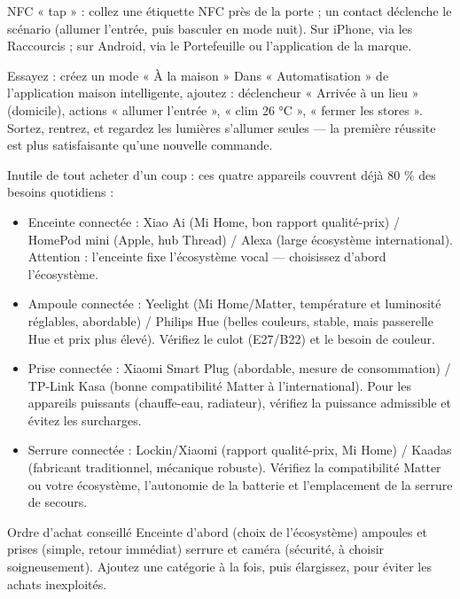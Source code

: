 NFC « tap » : collez une étiquette NFC près de la porte ; un contact déclenche le scénario (allumer l'entrée, puis basculer en mode nuit). Sur iPhone, via les Raccourcis ; sur Android, via le Portefeuille ou l'application de la marque.

\begin{tcbpractice}{Essayez : créez un mode « À la maison »}
Dans « Automatisation » de l'application maison intelligente, ajoutez : déclencheur « Arrivée à un lieu » (domicile), actions « allumer l'entrée », « clim 26 °C », « fermer les stores ». Sortez, rentrez, et regardez les lumières s'allumer seules — la première réussite est plus satisfaisante qu'une nouvelle commande.

\end{tcbpractice}


Inutile de tout acheter d'un coup : ces quatre appareils couvrent déjà 80 \% des besoins quotidiens :

\begin{itemize}
  \item Enceinte connectée : Xiao Ai (Mi Home, bon rapport qualité-prix) / HomePod mini (Apple, hub Thread) / Alexa (large écosystème international). Attention : l'enceinte fixe l'écosystème vocal — choisissez d'abord l'écosystème.
  \item Ampoule connectée : Yeelight (Mi Home/Matter, température et luminosité réglables, abordable) / Philips Hue (belles couleurs, stable, mais passerelle Hue et prix plus élevé). Vérifiez le culot (E27/B22) et le besoin de couleur.
  \item Prise connectée : Xiaomi Smart Plug (abordable, mesure de consommation) / TP-Link Kasa (bonne compatibilité Matter à l'international). Pour les appareils puissants (chauffe-eau, radiateur), vérifiez la puissance admissible et évitez les surcharges.
  \item Serrure connectée : Lockin/Xiaomi (rapport qualité-prix, Mi Home) / Kaadas (fabricant traditionnel, mécanique robuste). Vérifiez la compatibilité Matter ou votre écosystème, l'autonomie de la batterie et l'emplacement de la serrure de secours.
\end{itemize}

\begin{tcbinfo}{Ordre d'achat conseillé}
Enceinte d'abord (choix de l'écosystème) ampoules et prises (simple, retour immédiat) serrure et caméra (sécurité, à choisir soigneusement). Ajoutez une catégorie à la fois, puis élargissez, pour éviter les achats inexploités.

\end{tcbinfo}

